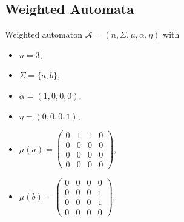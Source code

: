         \subsection{Weighted Automata}\label{wa_ex}
            Weighted automaton $\mathcal{A} = (n, \Sigma, \mu, \alpha, \eta)$ with \\
            \begin{minipage}{0.48\textwidth}
             \begin{itemize}
                \item $n = 3$,
                \item $\Sigma = \{a, b\}$,
                \item $\alpha = (1,0,0,0)$,
                \item $\eta = (0,0,0,1)$,
                \end{itemize}
            \end{minipage} \begin{minipage}{0.48\textwidth}
             \begin{itemize}
                 \item $\mu(a) = \begin{pmatrix}
                                    0 & 1 & 1 & 0 \\
                                    0 & 0 & 0 & 0 \\
                                    0 & 0 & 0 & 0 \\
                                    0 & 0 & 0 & 0
                                \end{pmatrix}$, 
                    \item $\mu(b)= \begin{pmatrix}
                                    0 & 0 & 0 & 0 \\
                                    0 & 0 & 0 & 1 \\
                                    0 & 0 & 0 & 1 \\
                                    0 & 0 & 0 & 0
                                 \end{pmatrix}
                                $.
                \end{itemize}
            \end{minipage}
            \begin{center}
            \end{center}

